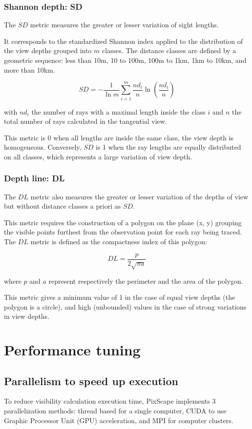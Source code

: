 \documentclass{report}
\begin{document}
\subsection{Shannon depth: SD}
The $SD$ metric measures the greater or lesser variation of sight lengths.

It corresponds to the standardized Shannon index applied to the distribution of the view depths grouped into $m$ classes. The distance classes are defined by a geometric sequence: less than 10m, 10 to 100m, 100m to 1km, 1km to 10km, and more than 10km.

$$SD = -\frac{1}{\ln m}\sum_{i=1}^{m}\frac{nd_i}{n}\ln\left(\frac{nd_i}{n}\right)$$

with $nd_i$ the number of rays with a maximal length inside the class $i$ and $n$ the total number of rays calculated in the tangential view.

This metric is 0 when all lengths are inside the same class, the view depth is homogeneous. Conversely, $SD$ is 1 when the ray lengths are equally distributed on all classes, which represents a large variation of view depth.


\subsection{Depth line: DL}
The $DL$ metric also measures the greater or lesser variation of the depths of view but without distance classes a priori as $SD$.

This metric requires the construction of a polygon on the plane (x, y) grouping the visible points furthest from the observation point for each ray being traced. The $DL$ metric is defined as the compactness index of this polygon:

$$DL=\frac{p}{2\sqrt{\pi a}}$$

where $p$ and $a$ represent respectively the perimeter and the area of the polygon. 

This metric gives a minimum value of 1 in the case of equal view depths (the polygon is a circle), and high (unbounded) values in the case of strong variations in view depths.


\chapter{Performance tuning}
\label{perf}

\section{Parallelism to speed up execution}
\label{parallelism}
To reduce visibility calculation execution time, PixScape implements 3 parallelization methods: thread based for a single computer, CUDA to use Graphic Processor Unit (GPU) acceleration, and MPI for computer clusters.
\end{document}
